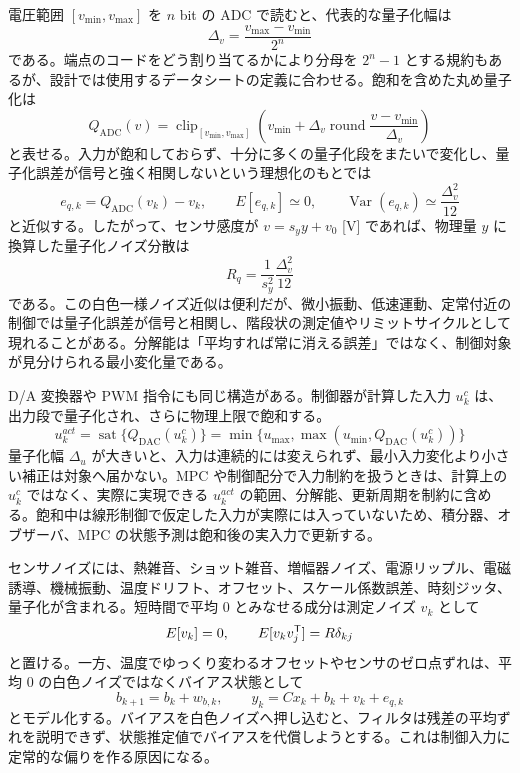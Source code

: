 電圧範囲 $[v_{\min},v_{\max}]$ を $n$ bit の ADC で読むと、代表的な量子化幅は
\begin{equation}
  \Delta_v=\frac{v_{\max}-v_{\min}}{2^n}
\end{equation}
である。端点のコードをどう割り当てるかにより分母を $2^n-1$ とする規約もあるが、設計では使用するデータシートの定義に合わせる。飽和を含めた丸め量子化は
\begin{equation}
  Q_{\mathrm{ADC}}(v)
  =
  \operatorname{clip}_{[v_{\min},v_{\max}]}
  \left(
  v_{\min}
  +\Delta_v
  \operatorname{round}
  \frac{v-v_{\min}}{\Delta_v}
  \right)
\end{equation}
と表せる。入力が飽和しておらず、十分に多くの量子化段をまたいで変化し、量子化誤差が信号と強く相関しないという理想化のもとでは
\begin{equation}
  e_{q,k}=Q_{\mathrm{ADC}}(v_k)-v_k,
  \qquad
  E[e_{q,k}]\simeq0,
  \qquad
  \operatorname{Var}(e_{q,k})\simeq\frac{\Delta_v^2}{12}
\end{equation}
と近似する。したがって、センサ感度が $v=s_y y+v_0$ [V] であれば、物理量 $y$ に換算した量子化ノイズ分散は
\begin{equation}
  R_q=\frac{1}{s_y^2}\frac{\Delta_v^2}{12}
\end{equation}
である。この白色一様ノイズ近似は便利だが、微小振動、低速運動、定常付近の制御では量子化誤差が信号と相関し、階段状の測定値やリミットサイクルとして現れることがある。分解能は「平均すれば常に消える誤差」ではなく、制御対象が見分けられる最小変化量である。

D/A 変換器や PWM 指令にも同じ構造がある。制御器が計算した入力 $u_k^c$ は、出力段で量子化され、さらに物理上限で飽和する。
\begin{equation}
  u_k^{act}
  =
  \operatorname{sat}
  \{Q_{\mathrm{DAC}}(u_k^c)\}
  =
  \min\{u_{\max},\max(u_{\min},Q_{\mathrm{DAC}}(u_k^c))\}
\end{equation}
量子化幅 $\Delta_u$ が大きいと、入力は連続的には変えられず、最小入力変化より小さい補正は対象へ届かない。MPC や制御配分で入力制約を扱うときは、計算上の $u_k^c$ ではなく、実際に実現できる $u_k^{act}$ の範囲、分解能、更新周期を制約に含める。飽和中は線形制御で仮定した入力が実際には入っていないため、積分器、オブザーバ、MPC の状態予測は飽和後の実入力で更新する。

センサノイズには、熱雑音、ショット雑音、増幅器ノイズ、電源リップル、電磁誘導、機械振動、温度ドリフト、オフセット、スケール係数誤差、時刻ジッタ、量子化が含まれる。短時間で平均 0 とみなせる成分は測定ノイズ $v_k$ として
\begin{equation}
  E[v_k]=0,
  \qquad
  E[v_kv_j^{\mathsf{T}}]=R\delta_{kj}
\end{equation}
と置ける。一方、温度でゆっくり変わるオフセットやセンサのゼロ点ずれは、平均 0 の白色ノイズではなくバイアス状態として
\begin{equation}
  b_{k+1}=b_k+w_{b,k},
  \qquad
  y_k=Cx_k+b_k+v_k+e_{q,k}
\end{equation}
とモデル化する。バイアスを白色ノイズへ押し込むと、フィルタは残差の平均ずれを説明できず、状態推定値でバイアスを代償しようとする。これは制御入力に定常的な偏りを作る原因になる。

